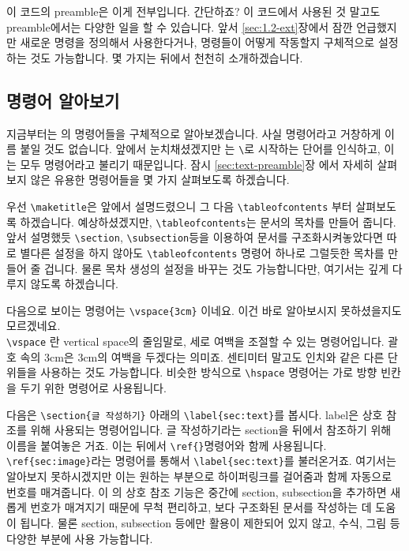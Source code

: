 이 코드의 preamble은 이게 전부입니다. 간단하죠?
이 코드에서 사용된 것 말고도  preamble에서는 다양한 일을 할 수 있습니다.
앞서 \ref{sec:1.2-ext}장에서 잠깐 언급했지만 새로운 명령을 정의해서 사용한다거나, 명령들이 어떻게 작동할지 구체적으로 설정하는 것도 가능합니다.
몇 가지는 뒤에서 천천히 소개하겠습니다.


\subsection{명령어 알아보기}
\label{sec:3-cmd}
지금부터는 \lt 의 명령어들을 구체적으로 알아보겠습니다.
사실 명령어라고 거창하게 이름 붙일 것도 없습니다.
앞에서 눈치채셨겠지만 \lt 는 \verb|\|로 시작하는 단어를 인식하고, 이는 모두 명령어라고 불리기 때문입니다.
잠시 \ref{sec:text-preamble}장 에서 자세히 살펴보지 않은 유용한 \lt 명령어들을 몇 가지 살펴보도록 하겠습니다.

우선 \verb|\maketitle|은 앞에서 설명드렸으니 그 다음 \verb|\tableofcontents| 부터 살펴보도록 하겠습니다.
예상하셨겠지만, \verb|\tableofcontents|는 문서의 목차를 만들어 줍니다.
앞서 설명했듯 \verb|\section|, \verb|\subsection|등을 이용하여 문서를 구조화시켜놓았다면 따로 별다른 설정을 하지 않아도 \verb|\tableofcontents| 명령어 하나로 그럴듯한 목차를 만들어 줄 겁니다.
물론 목차 생성의 설정을 바꾸는 것도 가능합니다만, 여기서는 깊게 다루지 않도록 하겠습니다.

다음으로 보이는 명령어는 \verb|\vspace{3cm}| 이네요.
이건 바로 알아보시지 못하셨을지도 모르겠네요.\\
\verb|\vspace| 란 vertical space의 줄임말로, 세로 여백을 조절할 수 있는 명령어입니다.
괄호 속의 3cm은 3cm의 여백을 두겠다는 의미죠.
센티미터 말고도 인치와 같은 다른 단위들을 사용하는 것도 가능합니다.
비슷한 방식으로 \verb|\hspace| 명령어는 가로 방향 빈칸을 두기 위한 명령어로 사용됩니다.

다음은 \verb|\section{글 작성하기}| 아래의 \verb|\label{sec:text}|를 봅시다.
label은 상호 참조를 위해 사용되는 명령어입니다.
글 작성하기라는 section을 뒤에서 참조하기 위해 이름을 붙여놓은 거죠.
이는 뒤에서 \verb|\ref{}|명령어와 함께 사용됩니다.
\verb|\ref{sec:image}|라는 명령어를 통해서 \verb|\label{sec:text}|를 불러온거죠.
여기서는 알아보지 못하시겠지만 이는 원하는 부분으로 하이퍼링크를 걸어줌과 함께 자동으로 번호를 매겨줍니다.
이 \lt 의 상호 참조 기능은 중간에 section, subsection을 추가하면 새롭게 번호가 매겨지기 때문에 무척 편리하고, 보다 구조화된 문서를 작성하는 데 도움이 됩니다.
물론 section, subsection 등에만 활용이 제한되어 있지 않고, 수식, 그림 등 다양한 부분에 사용 가능합니다.

